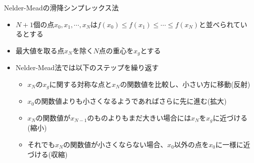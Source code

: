 \documentclass[dvipdfmx]{beamer}
\begin{document}
\begin{frame}[t,fragile]{Nelder-Meadの滑降シンプレックス法}
  \begin{itemize}
    \setlength{\itemsep}{1em}
  \item $N+1$個の点$x_0,x_1,\cdots,x_N$は$f(x_0) \le f(x_1) \le \cdots \le f(x_N)$と並べられているとする
  \item 最大値を取る点$x_N$を除く$N$点の重心を$x_g$とする
  \item Nelder-Mead法では以下のステップを繰り返す
    \begin{itemize}
      \item $x_N$の$x_g$に関する対称な点と$x_N$の関数値を比較し、小さい方に移動(反射)
      \item $x_0$の関数値よりも小さくなるようであればさらに先に進む(拡大)
      \item $x_N$の関数値が$x_{N-1}$のものよりもまだ大きい場合には$x_N$を$x_g$に近づける(縮小)
      \item それでも$x_N$の関数値が小さくならない場合、$x_0$以外の点を$x_0$に一様に近づける(収縮)
    \end{itemize}
  \end{itemize}
\end{frame}
\end{document}
